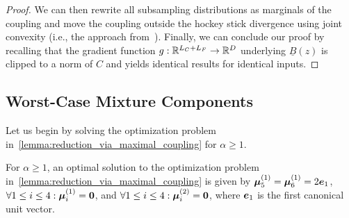 \begin{proof}
    We can then rewrite all subsampling distributions as marginals of the coupling and move the coupling outside the hockey stick divergence using joint convexity (i.e., the approach from~\cite{schuchardt2024unified}).
    Finally, we can conclude our proof by recalling that the gradient function $g : {\mathbb{R}}^{L_C + L_F} \rightarrow {\mathbb{R}}^D$ underlying $\underline{B}(z)$  is clipped to a norm of $C$ and yields identical results for identical inputs.
\end{proof}

\subsection{Worst-Case Mixture Components}
Let us begin by solving the optimization problem in~\cref{lemma:reduction_via_maximal_coupling} for $\alpha \geq 1$.
\begin{lemma}
    For $\alpha \geq 1$, an optimal solution to the optimization problem in~\cref{lemma:reduction_via_maximal_coupling}
    is given by ${\bm{\mu}}^{(1)}_5 = {\bm{\mu}}^{(1)}_6 = 2 {\bm{e}}_1$,
    $\forall 1 \leq i \leq 4 : {\bm{\mu}}^{(1)}_i = {\bm{0}} $,
    and $\forall 1 \leq i \leq 4 : {\bm{\mu}}^{(2)}_i = {\bm{0}} $,
    where ${\bm{e}}_1$ is the first canonical unit vector.
\end{lemma}
